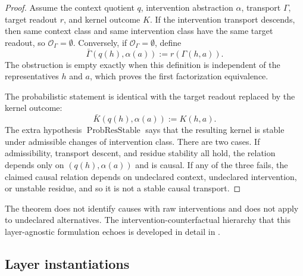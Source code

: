 \documentclass[11pt]{article}
\theoremstyle{definition}
\begin{document}
\begin{proof}
Assume the context quotient \(q\), intervention abstraction
\(\alpha\), transport \(\Gamma\), target readout \(r\), and kernel
outcome \(K\).  If the intervention transport descends, then same
context class and same intervention class have the same target
readout, so \(\mathcal O_{\Gamma}=\emptyset\).  Conversely, if
\(\mathcal O_{\Gamma}=\emptyset\), define
\[
  \bar\Gamma(q(h),\alpha(a)):=r(\Gamma(h,a)).
\]
The obstruction is empty exactly when this definition is independent
of the representatives \(h\) and \(a\), which proves the first
factorization equivalence.

The probabilistic statement is identical with the target readout
replaced by the kernel outcome:
\[
  \bar K(q(h),\alpha(a)):=K(h,a).
\]
The extra hypothesis \(\operatorname{ProbResStable}\) says that the
resulting kernel is stable under admissible changes of intervention
class.  There are two cases.  If admissibility, transport descent,
and residue stability all hold, the relation depends only on
\((q(h),\alpha(a))\) and is causal.  If any of the three fails, the
claimed causal relation depends on undeclared context, undeclared
intervention, or unstable residue, and so it is not a stable causal
transport.
\end{proof}

The theorem does not identify causes with raw interventions and does
not apply to undeclared alternatives.  The intervention-counterfactual
hierarchy that this layer-agnostic formulation echoes is developed
in detail in \citet{Pearl2009Causality}.

\subsection*{Layer instantiations}\label{layer-inst:F25}
\end{document}
